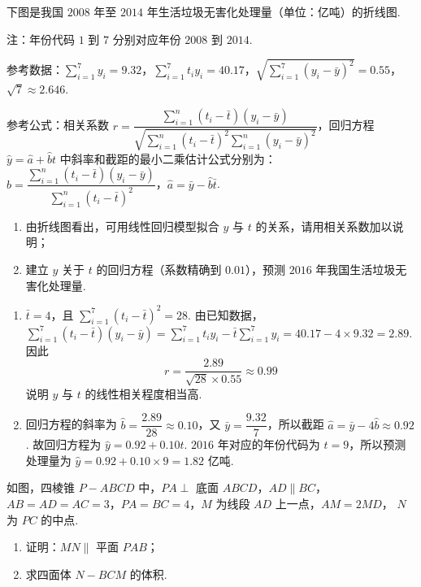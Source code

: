 \begin{problem}
下图是我国 \(2008\) 年至 \(2014\) 年生活垃圾无害化处理量（单位：亿吨）的折线图.

注：年份代码 \(1\) 到 \(7\) 分别对应年份 \(2008\) 到 \(2014\).

参考数据：\(\sum_{i=1}^{7}y_i=9.32\)，\(\sum_{i=1}^{7}t_iy_i=40.17\)，\(\sqrt{\sum_{i=1}^{7}\left( y_i-\bar y \right)^2}=0.55\)，\(\sqrt7\approx2.646\).

参考公式：相关系数 \(r=\dfrac{\sum_{i=1}^{n}\left( t_i-\bar t \right)\left( y_i-\bar y \right)}{\sqrt{\sum_{i=1}^{n}\left( t_i-\bar t \right)^2\sum_{i=1}^{n}\left( y_i-\bar y \right)^2}}\)，回归方程 \(\hat y=\hat a+\hat b t\) 中斜率和截距的最小二乘估计公式分别为：\(\hat b=\dfrac{\sum_{i=1}^{n}\left( t_i-\bar t \right)\left( y_i-\bar y \right)}{\sum_{i=1}^{n}\left( t_i-\bar t \right)^2}\)，\(\hat a=\bar y-\hat b\bar t\).

\begin{enumerate}
\item 由折线图看出，可用线性回归模型拟合 \(y\) 与 \(t\) 的关系，请用相关系数加以说明；
\item 建立 \(y\) 关于 \(t\) 的回归方程（系数精确到 \(0.01\)），预测 \(2016\) 年我国生活垃圾无害化处理量.
\end{enumerate}

\begingroup
\leftskip=0pt\relax
\rightskip=0pt\relax
\begingroup
{}
\endgroup
\endgroup
\end{problem}

\begin{solution}
\begin{enumerate}
\item \(\bar t=4\)，且 \(\sum_{i=1}^{7}(t_i-\bar t)^2=28\). 由已知数据，\(\sum_{i=1}^{7}(t_i-\bar t)(y_i-\bar y)=\sum_{i=1}^{7}t_i y_i-\bar t\sum_{i=1}^{7}y_i=40.17-4\times9.32=2.89\). 因此
\[
r=\frac{2.89}{\sqrt{28}\times0.55}\approx0.99
\]
说明 \(y\) 与 \(t\) 的线性相关程度相当高.
\item 回归方程的斜率为 \(\hat b=\dfrac{2.89}{28}\approx0.10\)，又 \(\bar y=\dfrac{9.32}{7}\)，所以截距 \(\hat a=\bar y-4\hat b\approx0.92\). 故回归方程为 \(\hat y=0.92+0.10t\). \(2016\) 年对应的年份代码为 \(t=9\)，所以预测处理量为 \(\hat y=0.92+0.10\times9=1.82\) 亿吨.
\end{enumerate}
\end{solution}

\begin{problem}
如图，四棱锥 \(P-ABCD\) 中，\(PA\perp\) 底面 \(ABCD\)，\allowbreak \(AD\parallel BC\)，
\allowbreak \(AB=AD=AC=3\)，\allowbreak \(PA=BC=4\)，\(M\) 为线段 \(AD\) 上一点，\allowbreak \(AM=2MD\)，
\(N\) 为 \(PC\) 的中点.

\begin{enumerate}
\item 证明：\(MN\parallel\) 平面 \(PAB\)；
\item 求四面体 \(N-BCM\) 的体积.
\end{enumerate}

\begingroup
{}
\endgroup
\end{problem}

